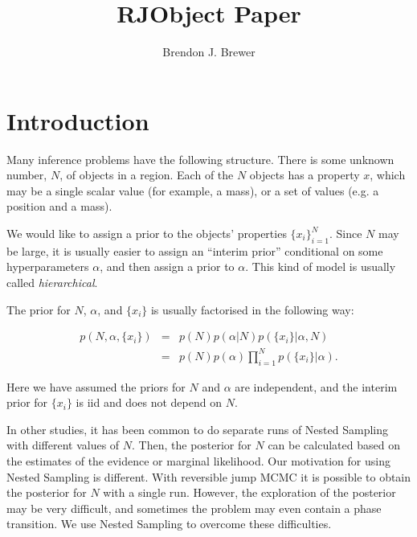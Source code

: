 \documentclass[letterpaper, 11pt]{article}
\title{RJObject Paper}
\author{Brendon J. Brewer}
\begin{document}
\maketitle
{}

\section{Introduction}
\setlength{\parindent}{0cm}
\setlength{\parskip}{3mm}
Many inference problems have the following structure. There is some unknown
number, $N$, of objects in a region. Each of the $N$ objects has a property
$x$, which may be a single scalar value (for example, a mass), or a set of
values (e.g. a position and a mass).

We would like to assign a prior to the objects' properties $\{x_i\}_{i=1}^N$.
Since $N$ may be large, it is usually easier to assign an ``interim prior''
conditional on some hyperparameters $\alpha$, and then assign a prior to
$\alpha$. This kind of model is usually called {\it hierarchical}.

The prior for $N$, $\alpha$, and $\{x_i\}$ is usually factorised
in the following way:

\begin{eqnarray}
p(N, \alpha, \{x_i\}) &=& p(N) p(\alpha | N) p(\{x_i\} | \alpha, N) \\
&=& p(N) p(\alpha) \prod_{i=1}^N p(\{x_i\} | \alpha).
\end{eqnarray}

Here we have assumed the priors for $N$ and $\alpha$ are independent, and
the interim prior for $\{x_i\}$ is iid and does not depend on $N$.


In other studies, it has been common to do separate runs of Nested Sampling
with different values of $N$. Then, the posterior for $N$ can be calculated
based on the estimates of the evidence or marginal likelihood. Our motivation
for using Nested Sampling is different. With reversible jump MCMC it is possible
to obtain the posterior for $N$ with a single run. However, the exploration
of the posterior may be very difficult, and sometimes the problem may even
contain a phase transition. We use Nested Sampling to overcome these
difficulties.

\end{document}
